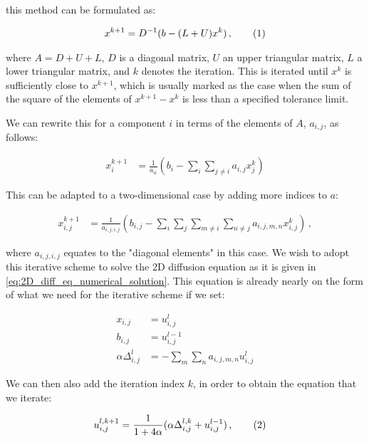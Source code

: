 \documentclass[reprint,english,notitlepage]{revtex4-1}  %
\newcommand\numberthis{\addtocounter{equation}{1}\tag{\theequation}}
\begin{document}
this method can be formulated as:

\begin{align*}
x^{k+1} = D^{-1}(b - (L+U)x^k) \, , \numberthis \label{eq:jacobi_iterative_method}
\end{align*}

where $A = D + U + L$, $D$ is a diagonal matrix, $U$ an upper triangular matrix, $L$ a lower triangular matrix, and $k$ denotes the iteration. This is iterated until $x^k$ is sufficiently close to $x^{k+1}$, which is usually marked as the case when the sum of the square of the elements of $x^{k+1} - x^k$ is less than a specified tolerance limit. 


We can rewrite this for a component $i$ in terms of the elements of $A$, $a_{i,j}$, as follows:

\begin{align*}
x^{k+1}_i &= \frac{1}{a_{ii}} ( b_i - \sum\limits_i \sum\limits_{j\neq i} a_{i,j} x_j^k)
\end{align*}

This can be adapted to a two-dimensional case by adding more indices to $a$:

\begin{align*}
x_{i,j}^{k+1} &= \frac{1}{a_{i,j,i,j}} (b_{i,j} - \sum\limits_i \sum\limits_j \sum\limits_{m\neq i} \sum\limits_{n \neq j} a_{i,j,m,n} x_{i,j}^k ) \, ,
\end{align*}

where $a_{i,j,i,j}$ equates to the "diagonal elements" in this case. We wish to adopt this iterative scheme to solve the 2D diffusion equation as it is given in \eqref{eq:2D_diff_eq_numerical_solution}. This equation is already nearly on the form of what we need for the iterative scheme if we set:

\begin{align*}
x_{i,j} &= u_{i,j}^l \\
b_{i,j} &= u_{i,j}^{l-1} \\
\alpha \Delta_{i,j}^l &= -\sum\limits_m \sum\limits_n a_{i,j,m,n}  u_{i,j}^l
\end{align*} 

We can then also add the iteration index $k$, in order to obtain the equation that we iterate:

\begin{align*}
u_{i,j}^{l,k+1} &= \frac{1}{1 + 4\alpha} (\alpha \Delta_{i,j}^{l,k} + u_{i,j}^{l-1}) \, , \numberthis \label{eq:2D_diff_eq_jacobi_iter}
\end{align*}
\end{document}
